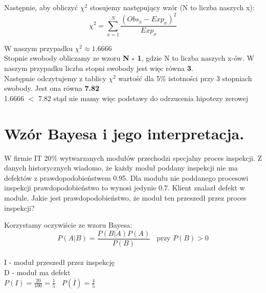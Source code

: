 \documentclass[12pt]{article}
\begin{document}
    Następnie, aby obliczyć $\chi^{2}$ stosujemy następujący wzór (N to liczba naszych x):
    \begin{equation*}
        \chi^{2} = \sum_{x=1}^{N} \frac{(Obs_{x} - Exp_{x})^{2}}{Exp_{x}}
    \end{equation*}

    W naszym przypadku $\chi^{2} \approx 1.6666$ \\

    Stopnie swobody obliczamy ze wzoru \textbf{N - 1}, gdzie N to liczba naszych x-ów. W naszym przypadku liczba stopni swobody jest więc równa \textbf{3}. \\

    Następnie odczytujemy z tablicy $\chi^{2}$ wartość dla 5\% istotności przy 3 stopniach swobody. Jest ona równa \textbf{7.82} \\

    1.6666 $<$ 7.82 stąd nie mamy więc podstawy do odrzucenia hipotezy zerowej

    \newpage






    \section{Wzór Bayesa i jego interpretacja.}
    \begin{exercise}
        W firmie IT 20\% wytwarzanych modułów przechodzi specjalny proces inspekcji. Z danych historycznych wiadomo, że każdy moduł poddany inspekcji nie ma defektów z prawdopodobieństwem 0.95. Dla modułu nie poddanego procesowi inspekcji prawdopodobieństwo to wynosi jedynie 0.7. Klient znalazł defekt w module. Jakie jest prawdopodobieństwo, że moduł ten przeszedł przez proces inspekcji?
    \end{exercise}

    Korzystamy oczywiście ze wzoru Bayesa:
    \begin{equation*}
        P(A|B) = \frac{P(B|A)P(A)}{P(B)} ~ ~ ~ ~ \text{przy $P(B) > 0$}
    \end{equation*} \\

    I - moduł przeszedł przez inspekcję \\
    D - moduł ma defekt \\

    $P(I) = \frac{20}{100} = \frac{1}{5} ~ ~ ~ ~ P(\bar{I}) = \frac{4}{5}$ \\
\end{document}
